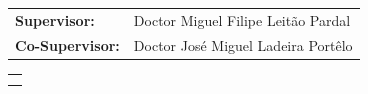 {\vspace*{15mm}

%
%
\hspace*{-10.5mm}
\begin{tabular}{p{35mm}p{110.5mm}}
{\sffamily\large {\bf Supervisor:}}
& {\sffamily\large Doctor Miguel Filipe Leit\~{a}o Pardal}\smallskip\\
{\sffamily\large {\bf Co-Supervisor:}}
& {\sffamily\large Doctor Jos\'{e} Miguel Ladeira Port\^{e}lo}\smallskip\\
\end{tabular}

\vspace*{15mm}

%
%
\hspace*{-10.5mm}
\begin{tabular}{p{155.5mm}}
\centering{\sffamily\Large Thesis to obtain the Masters Degree in}\\
\centering{\sffamily\bfseries\LARGE Information Systems and Computer Engineering}
\end{tabular}

\vspace*{5mm}

%
%

\vfill

}
